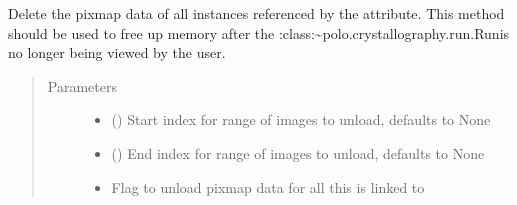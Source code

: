 \documentclass[letterpaper,10pt,english]{sphinxmanual}
\begin{document}
\begin{fulllineitems}
\begin{fulllineitems}
\label{\detokenize{polo.crystallography:polo.crystallography.run.Run.unload_all_pixmaps}}
Delete the pixmap data of all 
{\hyperref[\detokenize{polo.crystallography:polo.crystallography.image.Image}]{}} instances referenced by the
 attribute. 
This method should be used to free up memory after the 
:class:{\color{red}\bfseries{}\textasciigrave{}}\textasciitilde{}polo.crystallography.run.Run\textasciigrave{}is no longer being
viewed by the user.
\begin{quote}\begin{description}
\item[{Parameters}] \leavevmode\begin{itemize}
\item {} 
 (\sphinxstyleliteralemphasis{\sphinxupquote{, }}) \textendash{} Start index for range of images to unload, defaults to None

\item {} 
 (\sphinxstyleliteralemphasis{\sphinxupquote{, }}) \textendash{} End index for range of images to unload, defaults to None

\item {} 
 \textendash{} Flag to unload pixmap data for all 
this {\hyperref[\detokenize{polo.crystallography:polo.crystallography.image.Image}]{}} is linked
to

\end{itemize}

\end{description}\end{quote}

\end{fulllineitems}


\end{fulllineitems}
\end{document}
